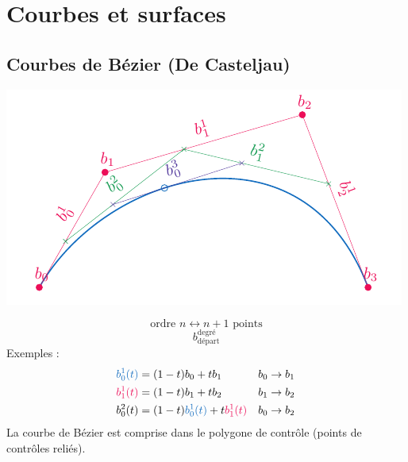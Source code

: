 \documentclass[resume]{subfiles}
\begin{document}
    \section{Courbes et surfaces}
    \subsection{Courbes de Bézier (De Casteljau)}
    \begin{center}
	\includegraphics[width=0.6\columnwidth,page=1]{drwg_0.pdf}
	\end{center}
    $$\text{ordre }n \longleftrightarrow n+1\text{ points}$$
	$$\boxed{b_{\text{départ}}^{\text{degré}}}$$
	Exemples :
	\begin{align*}
		\textcolor{RoyalBlue}{b_{0}^{1}(t)}&=(1-t)b_0+tb_1 & b_0\to b_1\\
		\textcolor{OrangeRed}{b_{1}^{1}(t)}&=(1-t)b_1+tb_2 & b_1\to b_2\\
		b_{0}^{2}(t)&=(1-t)\textcolor{RoyalBlue}{b_0^1(t)}+t\textcolor{OrangeRed}{b_1^1(t)} & b_0\to b_2
	\end{align*}
	La courbe de Bézier est comprise dans le polygone de contrôle (points de contrôles reliés).
\end{document}
